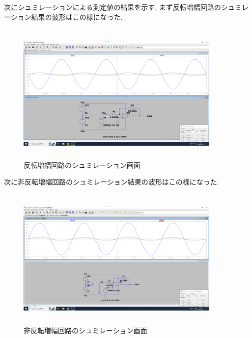 \documentclass[a4j,10pt,dvipdfmx]{jarticle}
\begin{document}
次にシュミレーションによる測定値の結果を示す.
まず反転増幅回路のシュミレーション結果の波形はこの様になった.
\begin{figure}[H]
  \begin{center}
  \includegraphics[height=7cm,width=10cm]{hantensimu.png}
  \caption{反転増幅回路のシュミレーション画面}
\end{center}
\end{figure}
次に非反転増幅回路のシュミレーション結果の波形はこの様になった.
\begin{figure}[H]
  \begin{center}
  \includegraphics[height=7cm,width=10cm]{hihantensimu.png}
  \caption{非反転増幅回路のシュミレーション画面}
\end{center}
\end{figure}
\end{document}
